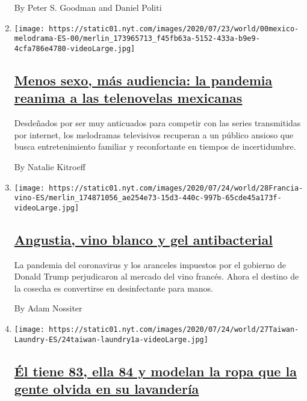 \begin{enumerate}
  By Peter S. Goodman and Daniel Politi
\item
  \texttt{[image: https://static01.nyt.com/images/2020/07/23/world/00mexico-melodrama-ES-00/merlin\_173965713\_f45fb63a-5152-433a-b9e9-4cfa786e4780-videoLarge.jpg]}

  \hypertarget{menos-sexo-muxe1s-audiencia-la-pandemia-reanima-a-las-telenovelas-mexicanas}{%
  \subsection{\texorpdfstring{\href{/es/2020/08/02/espanol/america-latina/televisa-rosa-de-guadalupe-netflix.html}{Menos
  sexo, más audiencia: la pandemia reanima a las telenovelas
  mexicanas}}{Menos sexo, más audiencia: la pandemia reanima a las telenovelas mexicanas}}\label{menos-sexo-muxe1s-audiencia-la-pandemia-reanima-a-las-telenovelas-mexicanas}}

  Desdeñados por ser muy anticuados para competir con las series
  transmitidas por internet, los melodramas televisivos recuperan a un
  público ansioso que busca entretenimiento familiar y reconfortante en
  tiempos de incertidumbre.

  By Natalie Kitroeff
\item
  \texttt{[image: https://static01.nyt.com/images/2020/07/24/world/28Francia-vino-ES/merlin\_174871056\_ae254e73-15d3-440c-997b-65cde45a173f-videoLarge.jpg]}

  \hypertarget{angustia-vino-blanco-y-gel-antibacterial}{%
  \subsection{\texorpdfstring{\href{/es/2020/07/28/espanol/mundo/vino-blanco-alsacia-coronavirus.html}{Angustia,
  vino blanco y gel
  antibacterial}}{Angustia, vino blanco y gel antibacterial}}\label{angustia-vino-blanco-y-gel-antibacterial}}

  La pandemia del coronavirus y los aranceles impuestos por el gobierno
  de Donald Trump perjudicaron al mercado del vino francés. Ahora el
  destino de la cosecha es convertirse en desinfectante para manos.

  By Adam Nossiter
\item
  \texttt{[image: https://static01.nyt.com/images/2020/07/24/world/27Taiwan-Laundry-ES/24taiwan-laundry1a-videoLarge.jpg]}

  \hypertarget{uxe9l-tiene-83-ella-84-y-modelan-la-ropa-que-la-gente-olvida-en-su-lavanderuxeda}{%
  \subsection{\texorpdfstring{\href{/es/2020/07/28/espanol/mundo/lavanderia-taiwanesa-instagram.html}{Él
  tiene 83, ella 84 y modelan la ropa que la gente olvida en su
  lavandería}}{Él tiene 83, ella 84 y modelan la ropa que la gente olvida en su lavandería}}\label{uxe9l-tiene-83-ella-84-y-modelan-la-ropa-que-la-gente-olvida-en-su-lavanderuxeda}}


\end{enumerate}
